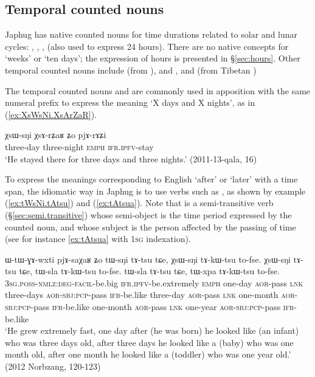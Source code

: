 \subsection{Temporal counted nouns} \label{sec:CN.time}
Japhug has native counted nouns for time durations related to solar and lunar cycles: , , ,  (also used to express 24 hours). There are no native concepts for `weeks' or `ten days'; the expression of hours is presented in §\ref{sec:hours}. Other temporal counted nouns include  (from ),  and , and  (from Tibetan )


The temporal counted nouns   and  are commonly used in apposition with the same numeral prefix to express the meaning `X days and X nights', as in (\ref{ex:XsWsNi.XsArZaR}).

\begin{exe}
\ex \label{ex:XsWsNi.XsArZaR}
\gll χsɯ-sŋi χsɤ-rʑaʁ ʑo pjɤ-rɤʑi \\
three-day three-night \textsc{emph} \textsc{ifr}.\textsc{ipfv}-stay \\
\glt `He stayed there for three days and three nights.' (2011-13-qala, 16)
\end{exe}  

To express the meanings corresponding to English `after' or `later' with a time span, the idiomatic way in Japhug is to use verbs such as , as shown by example (\ref{ex:tWsNi.tAtsu}) and (\ref{ex:tAtsua}). Note that  is a semi-transitive verb (§\ref{sec:semi.transitive}) whose semi-object is the time period expressed by the counted noun, and whose subject is the person affected by the passing of time (see for instance \ref{ex:tAtsua} with \textsc{1sg} indexation).

\begin{exe}
\ex \label{ex:tWsNi.tAtsu}
\gll ɯ-tɯ-ɣɤ-wxti pjɤ-saχaʁ ʑo tɯ-sŋi tɤ-tsu tɕe, χsɯ-sŋi tɤ-kɯ-tsu to-fse. χsɯ-sŋi tɤ-tsu tɕe, tɯ-sla tɤ-kɯ-tsu to-fse. tɯ-sla tɤ-tsu tɕe, tɯ-xpa tɤ-kɯ-tsu to-fse. \\
\textsc{3sg}.\textsc{poss}-\textsc{nmlz}:\textsc{deg}-\textsc{facil}-be.big \textsc{ifr}.\textsc{ipfv}-be.extremely \textsc{emph} one-day \textsc{aor}-pass \textsc{lnk} three-days \textsc{aor}-\textsc{sbj}:\textsc{pcp}-pass \textsc{ifr}-be.like three-day \textsc{aor}-pass \textsc{lnk} one-month \textsc{aor}-\textsc{sbj}:\textsc{pcp}-pass \textsc{ifr}-be.like one-month \textsc{aor}-pass \textsc{lnk} one-year \textsc{aor}-\textsc{sbj}:\textsc{pcp}-pass \textsc{ifr}-be.like  \\
\glt `He grew extremely fast, one day after (he was born) he looked like (an infant) who was three days old, after three days he looked like a (baby) who was one month old, after one month he looked like a (toddler) who was one year old.' (2012 Norbzang, 120-123)
\end{exe}


